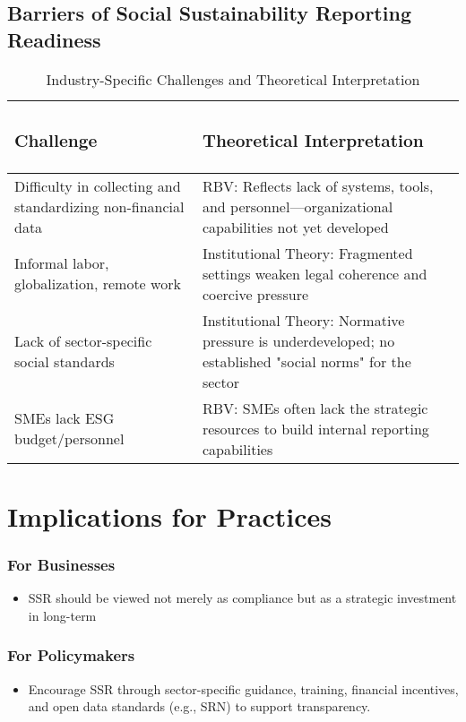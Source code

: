 \subsection{Barriers of Social Sustainability Reporting Readiness}

\begin{table}[H]
    \centering
    \caption{Industry-Specific Challenges and Theoretical Interpretation}
    \begin{tabular}{p{6cm}|p{8cm}}
        \subsubsection{Challenge} & \subsubsection{Theoretical Interpretation} \\
        \hline
        Difficulty in collecting and standardizing non-financial data & RBV: Reflects lack of systems, tools, and personnel—organizational capabilities not yet developed \\
        \hline
        Informal labor, globalization, remote work & Institutional Theory: Fragmented settings weaken legal coherence and coercive pressure \\
        \hline
        Lack of sector-specific social standards & Institutional Theory: Normative pressure is underdeveloped; no established "social norms" for the sector \\
        \hline
        SMEs lack ESG budget/personnel & RBV: SMEs often lack the strategic resources to build internal reporting capabilities
    \end{tabular}
\end{table}

\section{Implications for Practices}
\subsubsection{For Businesses}
\begin{itemize}
    \item SSR should be viewed not merely as compliance but as a strategic investment in long-term
\end{itemize}

\subsubsection{For Policymakers}
\begin{itemize}
    \item Encourage SSR through sector-specific guidance, training, financial incentives, and open data standards (e.g., SRN) to support transparency.
\end{itemize}

